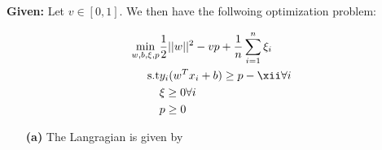 
\textbf{Given:} Let $v \in [0,1]$. We then have the follwoing optimization problem:

\begin{align*}
    \min_{w,b,\xi,p} &\frac{1}{2}||w||^2-vp+\frac{1}{n}\sum_{i=1}^n \xi_i\\
    \text{s.t} &y_i(w^Tx_i+b)\geq p-\xii \forall i \\
    &\xi \geq 0 \forall i\\
    &p\geq 0
\end{align*}

\begin{itemize}
    \item[\textbf{(a)}] The Langragian is given by 
\end{itemize}